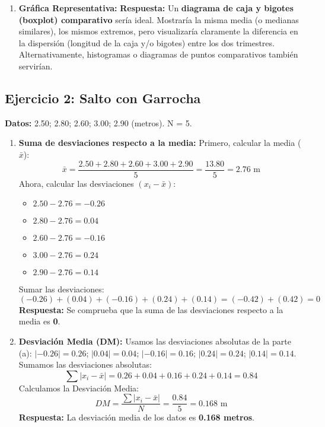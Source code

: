 \documentclass[12pt, a4paper]{article} %
\newcommand{\mean}[1]{\ensuremath{\bar{#1}}} %
\begin{document}
\begin{enumerate}
    \item \textbf{Gráfica Representativa:}
    \textbf{Respuesta:} Un \textbf{diagrama de caja y bigotes (boxplot) comparativo} sería ideal. Mostraría la misma media (o medianas similares), los mismos extremos, pero visualizaría claramente la diferencia en la dispersión (longitud de la caja y/o bigotes) entre los dos trimestres. Alternativamente, histogramas o diagramas de puntos comparativos también servirían.

\end{enumerate}

\subsection*{Ejercicio 2: Salto con Garrocha}
\textbf{Datos:} \num{2,50}; \num{2,80}; \num{2,60}; \num{3,00}; \num{2,90} (metros). N = 5.

\begin{enumerate}
    \item \textbf{Suma de desviaciones respecto a la media:}
    Primero, calcular la media (\mean{x}):
    \[ \mean{x} = \frac{\num{2,50} + \num{2,80} + \num{2,60} + \num{3,00} + \num{2,90}}{5} = \frac{\num{13,80}}{5} = \num{2,76} \text{ m} \]
    Ahora, calcular las desviaciones $(x_i - \mean{x})$:
    \begin{itemize}[nosep]
        \item $\num{2,50} - \num{2,76} = \num{-0,26}$
        \item $\num{2,80} - \num{2,76} = \num{+0,04}$
        \item $\num{2,60} - \num{2,76} = \num{-0,16}$
        \item $\num{3,00} - \num{2,76} = \num{+0,24}$
        \item $\num{2,90} - \num{2,76} = \num{+0,14}$
    \end{itemize}
    Sumar las desviaciones:
    \[ (\num{-0,26}) + (\num{+0,04}) + (\num{-0,16}) + (\num{+0,24}) + (\num{+0,14}) = (\num{-0,42}) + (\num{+0,42}) = 0 \]
    \textbf{Respuesta:} Se comprueba que la suma de las desviaciones respecto a la media es \textbf{0}.

    \item \textbf{Desviación Media (DM):}
    Usamos las desviaciones absolutas de la parte (a): $|\num{-0,26}|=\num{0,26}$; $|\num{+0,04}|=\num{0,04}$; $|\num{-0,16}|=\num{0,16}$; $|\num{+0,24}|=\num{0,24}$; $|\num{+0,14}|=\num{0,14}$.
    Sumamos las desviaciones absolutas:
    \[ \sum |x_i - \mean{x}| = \num{0,26} + \num{0,04} + \num{0,16} + \num{0,24} + \num{0,14} = \num{0,84} \]
    Calculamos la Desviación Media:
    \[ DM = \frac{\sum |x_i - \mean{x}|}{N} = \frac{\num{0,84}}{5} = \num{0,168} \text{ m} \]
    \textbf{Respuesta:} La desviación media de los datos es \textbf{\num{0,168} metros}.
\end{enumerate}
\end{document}
